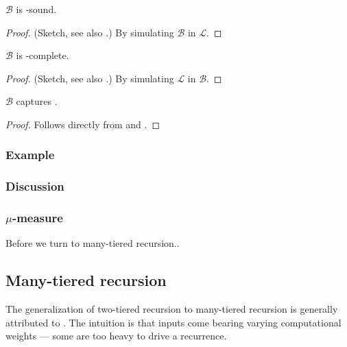 \begin{lemma} \label{lem:b-fptime-sound} $\mathcal{B}$ is \FPTIME{}-sound.
\end{lemma}

\begin{proof} (Sketch, see also \cite{bellantoni-cook-1992}.) By simulating
$\mathcal{B}$ in $\mathcal{L}$.   \end{proof}

\begin{lemma} \label{lem:b-fptime-complete} $\mathcal{B}$ is
\FPTIME{}-complete.  \end{lemma}

\begin{proof} (Sketch, see also \cite{bellantoni-cook-1992}.) By simulating
$\mathcal{L}$ in $\mathcal{B}$.  \end{proof}

\begin{theorem} $\mathcal{B}$ captures \FPTIME{}. \end{theorem}

\begin{proof} Follows directly from  and
. \end{proof}

\subsubsection{Example}

\subsubsection{Discussion}

\subsubsection{$\mu$-measure}

Before we turn to many-tiered recursion..

\subsection{Many-tiered recursion}

The generalization of two-tiered recursion to many-tiered recursion is
generally attributed to \cite{leivant-1995}. The intuition is that inputs come
bearing varying computational weights --- some are too heavy to drive a
recurrence.

